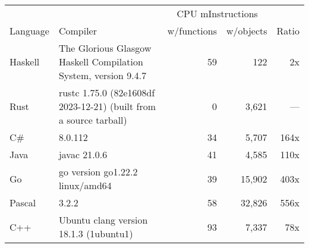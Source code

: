 \documentclass{article}
\begin{document}
      \begin{tabularx}{\linewidth}{lXrrr}
      \toprule
        & & \multicolumn{2}{c}{CPU mInstructions} & \\
        Language & Compiler & w/functions & w/objects & Ratio \\
      \midrule
    Haskell & The Glorious Glasgow Haskell Compilation System, version 9.4.7 & 59 & 122 & 2x \\
Rust & rustc 1.75.0 (82e1608df 2023-12-21) (built from a source tarball) & 0 & 3,621 & --- \\
C\# & 8.0.112 & 34 & 5,707 & 164x \\
Java & javac 21.0.6 & 41 & 4,585 & 110x \\
Go & go version go1.22.2 linux/amd64 & 39 & 15,902 & 403x \\
Pascal & 3.2.2 & 58 & 32,826 & 556x \\
C++ & Ubuntu clang version 18.1.3 (1ubuntu1) & 93 & 7,337 & 78x \\

      \bottomrule
      \end{tabularx}
      
\end{document}
